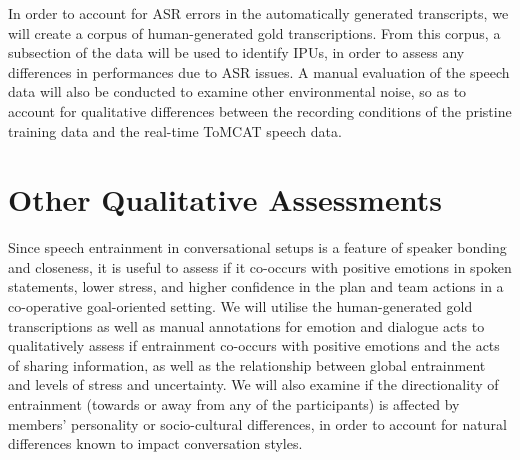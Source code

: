     In order to account for ASR errors in the automatically generated
    transcripts, we will create a corpus of human-generated gold
    transcriptions. From this corpus, a subsection of the data will be used to
    identify IPUs, in order to assess any differences in performances due to
    ASR issues. A manual evaluation of the speech data will also be conducted
    to examine other environmental noise, so as to account for qualitative
    differences between the recording conditions of the pristine training data
    and the real-time ToMCAT speech data. 

\section{Other Qualitative Assessments}

   Since speech entrainment in conversational setups is a feature of speaker
   bonding and closeness, it is useful to assess if it co-occurs with positive
   emotions in spoken statements, lower stress, and higher confidence in the
   plan and team actions in a co-operative goal-oriented setting. We will
   utilise the human-generated gold transcriptions as well as manual
   annotations for emotion and dialogue acts to qualitatively assess if
   entrainment co-occurs with positive emotions and the acts of sharing
   information, as well as the relationship between global entrainment and
   levels of stress and uncertainty. We will also examine if the directionality
   of entrainment (towards or away from any of the participants) is affected by
   members' personality or socio-cultural differences, in order to account for
   natural differences known to impact conversation styles.

